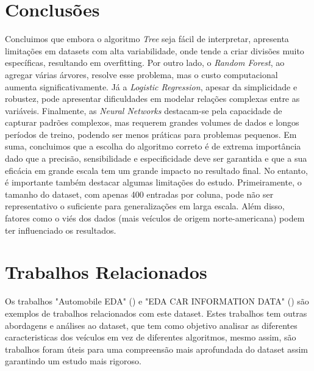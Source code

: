 \documentclass[conference]{IEEEtran}
\begin{document}
\newpage
\section{Conclusões}
Concluimos que embora o algoritmo \textit{Tree} seja fácil de interpretar, apresenta limitações em datasets com alta variabilidade,
onde tende a criar divisões muito específicas, resultando em overfitting. Por outro lado, o \textit{Random Forest}, ao agregar várias
árvores, resolve esse problema, mas o custo computacional aumenta significativamente. Já a \textit{Logistic Regression}, apesar da
simplicidade e robustez, pode apresentar dificuldades em modelar relações complexas entre as variáveis. Finalmente, as \textit{Neural Networks}
destacam-se pela capacidade de capturar padrões complexos, mas requerem grandes volumes de dados e longos períodos de treino, podendo
ser menos práticas para problemas pequenos. Em suma, concluimos que a escolha do algoritmo correto é de extrema importância dado que
a precisão, sensibilidade e especificidade deve ser garantida e que a sua eficácia em grande escala tem um grande impacto no resultado final.
No entanto, é importante também destacar algumas limitações do estudo. Primeiramente, o tamanho do dataset, com apenas 400 entradas por coluna,
pode não ser representativo o suficiente para generalizações em larga escala. Além disso, fatores como o viés dos dados
(mais veículos de origem norte-americana) podem ter influenciado os resultados.

\section{Trabalhos Relacionados}
Os trabalhos "Automobile EDA" (\cite{ref2}) e "EDA CAR INFORMATION DATA" (\cite{ref3}) são exemplos de trabalhos relacionados com este dataset.
Estes trabalhos tem outras abordagens e análises ao dataset, que tem como objetivo analisar as diferentes caracteristicas dos veículos
em vez de diferentes algoritmos, mesmo assim, são trabalhos foram úteis para uma compreensão mais aprofundada do dataset assim garantindo
um estudo mais rigoroso.

\printbibliography
\end{document}

